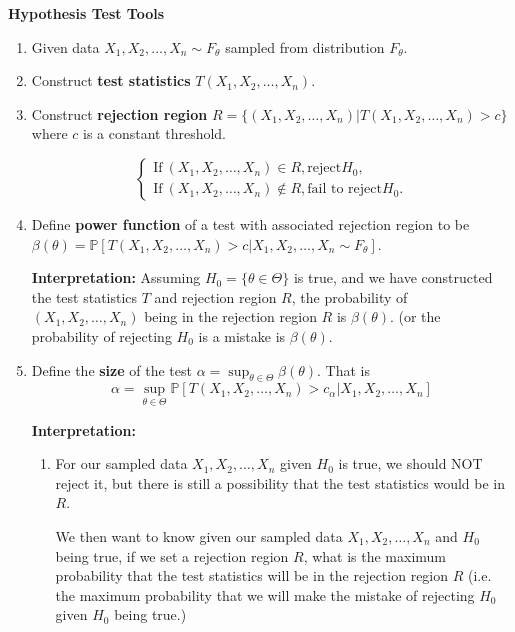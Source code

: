 \documentclass[13pt]{article}
\theoremstyle{definition}
\theoremstyle{remark}
\newcommand{\PP}{\mathbb{P}}
\begin{document}
\textbf{Hypothesis Test Tools}
\begin{enumerate}[label=(\arabic*)]
    \item Given data $X_1, X_2, \ldots, X_n \sim F_{\theta}$ sampled from distribution $F_{\theta}$.
    \item Construct \textbf{test statistics} $T(X_1, X_2, \ldots, X_n)$.
    \item Construct \textbf{rejection region} $R=\{(X_1, X_2, \ldots, X_n)|T(X_1, X_2, \ldots, X_n)>c\}$ where $c$ is a constant threshold.

    \[\begin{cases}
    \text{If}  ~(X_1, X_2, \ldots, X_n)\in R, \text{reject} H_0,\\
    \text{If}  ~(X_1, X_2, \ldots, X_n)\not\in R, \text{fail to reject} H_0.
    \end{cases}\]
    \item Define \textbf{power function} of a test with associated rejection region to be $\beta(\theta) = \PP[T(X_1, X_2, \ldots, X_n)>c|X_1, X_2, \ldots, X_n\sim F_{\theta}]$. 

    \textbf{Interpretation:} Assuming $H_0=\{\theta\in\Theta\}$ is true, and we have constructed the test statistics $T$ and rejection region $R$, the probability of $(X_1, X_2, \ldots, X_n)$ being in the rejection region $R$ is $\beta(\theta)$. (or the probability of rejecting $H_0$ is a mistake is $\beta(\theta)$.
    \item Define the \textbf{size} of the test $\alpha = \sup_{\theta\in\Theta} \beta(\theta)$. That is 
    \[
    \alpha = \sup_{\theta\in\Theta}\PP[T(X_1, X_2, \ldots, X_n)>c_{\alpha}|X_1, X_2, \ldots, X_n]
    \]

    \textbf{Interpretation:}
    \begin{enumerate}[label=(\alph*)]
    \item For our sampled data $X_1, X_2, \ldots, X_n$  given $H_0$ is true, we should NOT reject it, but there is still a possibility that the test statistics would be in $R$. 
    
    We then want to know given our sampled data $X_1, X_2, \ldots, X_n$  and $H_0$ being true, if we set a rejection region $R$, what is the maximum probability that the test statistics will be in the rejection region $R$ (i.e. the maximum probability that we will make the mistake of rejecting $H_0$ given $H_0$ being true.) 


\end{enumerate}
\end{enumerate}
\end{document}
